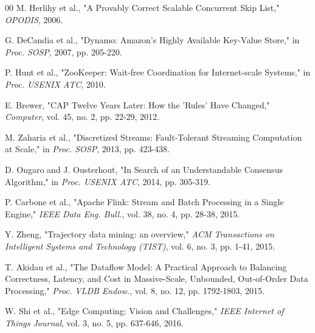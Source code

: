 \documentclass[conference]{IEEEtran}
\begin{document}
\begin{thebibliography}{00}
 M. Herlihy et al., "A Provably Correct Scalable Concurrent Skip List," \textit{OPODIS}, 2006.

 G. DeCandia et al., "Dynamo: Amazon's Highly Available Key-Value Store," in \textit{Proc. SOSP}, 2007, pp. 205-220.

 P. Hunt et al., "ZooKeeper: Wait-free Coordination for Internet-scale Systems," in \textit{Proc. USENIX ATC}, 2010.

 E. Brewer, "CAP Twelve Years Later: How the 'Rules' Have Changed," \textit{Computer}, vol. 45, no. 2, pp. 22-29, 2012.

 M. Zaharia et al., "Discretized Streams: Fault-Tolerant Streaming Computation at Scale," in \textit{Proc. SOSP}, 2013, pp. 423-438.

 D. Ongaro and J. Ousterhout, "In Search of an Understandable Consensus Algorithm," in \textit{Proc. USENIX ATC}, 2014, pp. 305-319.

 P. Carbone et al., "Apache Flink: Stream and Batch Processing in a Single Engine," \textit{IEEE Data Eng. Bull.}, vol. 38, no. 4, pp. 28-38, 2015.

 Y. Zheng, "Trajectory data mining: an overview," \textit{ACM Transactions on Intelligent Systems and Technology (TIST)}, vol. 6, no. 3, pp. 1-41, 2015.

 T. Akidau et al., "The Dataflow Model: A Practical Approach to Balancing Correctness, Latency, and Cost in Massive-Scale, Unbounded, Out-of-Order Data Processing," \textit{Proc. VLDB Endow.}, vol. 8, no. 12, pp. 1792-1803, 2015.

 W. Shi et al., "Edge Computing: Vision and Challenges," \textit{IEEE Internet of Things Journal}, vol. 3, no. 5, pp. 637-646, 2016.

\end{thebibliography}
\end{document}
